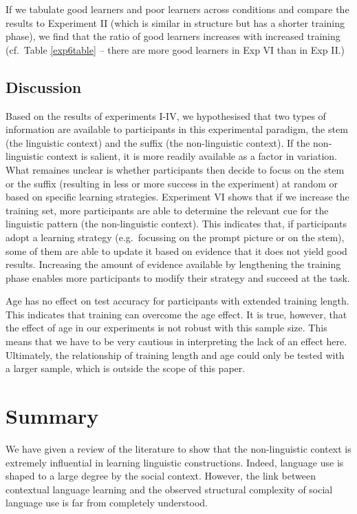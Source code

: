 \documentclass{frontiersSCNS} %
\begin{document}
If we tabulate good learners and poor learners across conditions and compare the results to Experiment II (which is similar in structure but has a shorter training phase), we find that the ratio of good learners increases with increased training (cf.\ Table \ref{exp6table} -- there are more good learners in Exp VI than in Exp II.)


\subsection{Discussion}

Based on the results of experiments I-IV, we hypothesised that two types of information are available to participants in this experimental paradigm, the stem (the linguistic context) and the suffix (the non-linguistic context). If the non-linguistic context is salient, it is more readily available as a factor in variation. What remaines unclear is whether participants then decide to focus on the stem or the suffix (resulting in less or more success in the experiment) at random or based on specific learning strategies. Experiment VI shows that if we increase the training set, more participants are able to determine the relevant cue for the linguistic pattern (the non-linguistic context). This indicates that, if participants adopt a learning strategy (e.g.\ focussing on the prompt picture or on the stem), some of them are able to update it based on evidence that it does not yield good results. Increasing the amount of  evidence available by lengthening the training phase enables more participants to modify their strategy and succeed at the task.


Age has no effect on test accuracy for participants with extended training length. This indicates that training can overcome the age effect. It is true, however, that the effect of age in our experiments is not robust with this sample size. This means that we have to be very cautious in interpreting the lack of an effect here. Ultimately, the relationship of training length and age could only be tested with a larger sample, which is outside the scope of this paper.


\section{Summary}

We have given a review of the literature to show that the non-linguistic context is extremely influential in learning linguistic constructions. Indeed, language use is shaped to a large degree by the social context. However, the link between contextual language learning and the observed structural complexity of social language use is far from completely understood. 
\end{document}
